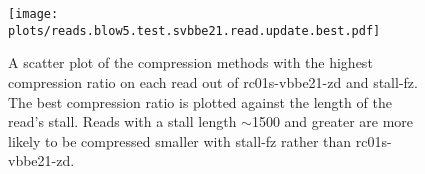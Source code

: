 \begin{figure}
\centering
%
\texttt{[image: plots/reads.blow5.test.svbbe21.read.update.best.pdf]}
\caption{\label{fig:stall-best}A scatter plot of the compression methods with
the highest compression ratio on each read out of rc01s-vbbe21-zd and stall-fz. The
best compression ratio is plotted against the length of the read's stall. Reads
with a stall length $\sim$1500 and greater are more likely to be compressed
smaller with stall-fz rather than rc01s-vbbe21-zd.}
\end{figure}
